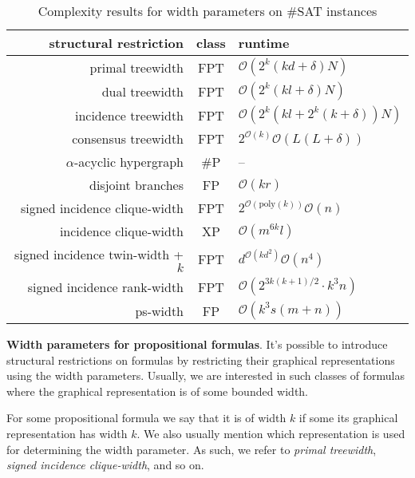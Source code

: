 \begin{table}
	\centering
	\begin{tabular}{r | c | l}
		\textbf{structural restriction} & \textbf{class} & \textbf{runtime} \\
		\hline
		primal treewidth \cite{DBLP:journals/jda/SamerS10} & FPT  & $\mathcal{O}(2^k(kd+\delta)N)$ \\
		dual treewidth \cite{DBLP:journals/jda/SamerS10} & FPT & $\mathcal{O}(2^k(kl+\delta)N)$ \\
		incidence treewidth \cite{DBLP:journals/jda/SamerS10} & FPT & $\mathcal{O}(2^k(kl+2^k(k+\delta))N)$ \\
		consensus treewidth \cite{DBLP:conf/sat/GanianS17} & FPT  & $2^{\mathcal{O}(k)}\mathcal{O}(L(L+\delta))$ \\
		\hline
		$\alpha$-acyclic hypergraph \cite{DBLP:conf/sat/CapelliDM14} & \#P  & -- \\
		disjoint branches \cite{DBLP:conf/sat/CapelliDM14} & FP & $\mathcal{O}(kr)$ \\
		\hline
		signed incidence clique-width \cite{DBLP:journals/dam/FischerMR08} & FPT & $2^{\mathcal{O}(\text{poly}(k))} \mathcal{O}(n)$ \\
		incidence clique-width \cite{DBLP:conf/isaac/SlivovskyS13} & XP & $\mathcal{O}(m^{6k} l)$ \\
		\hline
		signed incidence twin-width + $k$ \cite{DBLP:conf/sat/GanianPSSS22} & FPT & $d^{\mathcal{O}(kd^2)}\mathcal{O}(n^4)$ \\
		signed incidence rank-width \cite{DBLP:journals/fuin/GanianHO13} & FPT & $\mathcal{O}(2^{3k(k+1)/2}\cdot k^3 n)$ \\
		ps-width \cite{DBLP:conf/sat/SaetherTV14} & FP & $\mathcal{O}(k^3s(m+n))$
	\end{tabular}
	\caption{Complexity results for width parameters on \#SAT instances}
	\label{table:complexity}
\end{table}

\noindent
\textbf{Width parameters for propositional formulas}.
It's possible to introduce structural restrictions on formulas by restricting their graphical representations using the width parameters.
Usually, we are interested in such classes of formulas where the graphical representation is of some bounded width.

For some propositional formula we say that it is of width $k$ if some its graphical representation has width $k$.
We also usually mention which representation is used for determining the width parameter. As such, we refer to {\em primal treewidth}, {\em signed incidence clique-width}, and so on.

